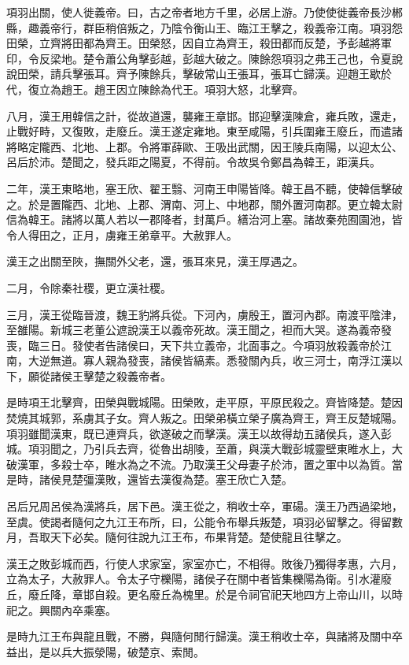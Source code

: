 項羽出關，使人徙義帝。曰，古之帝者地方千里，必居上游。乃使使徙義帝長沙郴縣，趣義帝行，群臣稍倍叛之，乃陰令衡山王、臨江王擊之，殺義帝江南。項羽怨田榮，立齊將田都為齊王。田榮怒，因自立為齊王，殺田都而反楚，予彭越將軍印，令反梁地。楚令蕭公角擊彭越，彭越大破之。陳餘怨項羽之弗王己也，令夏說說田榮，請兵擊張耳。齊予陳餘兵，擊破常山王張耳，張耳亡歸漢。迎趙王歇於代，復立為趙王。趙王因立陳餘為代王。項羽大怒，北擊齊。

八月，漢王用韓信之計，從故道還，襲雍王章邯。邯迎擊漢陳倉，雍兵敗，還走，止戰好畤，又復敗，走廢丘。漢王遂定雍地。東至咸陽，引兵圍雍王廢丘，而遣諸將略定隴西、北地、上郡。令將軍薛歐、王吸出武關，因王陵兵南陽，以迎太公、呂后於沛。楚聞之，發兵距之陽夏，不得前。令故吳令鄭昌為韓王，距漢兵。

二年，漢王東略地，塞王欣、翟王翳、河南王申陽皆降。韓王昌不聽，使韓信擊破之。於是置隴西、北地、上郡、渭南、河上、中地郡，關外置河南郡。更立韓太尉信為韓王。諸將以萬人若以一郡降者，封萬戶。繕治河上塞。諸故秦苑囿園池，皆令人得田之，正月，虜雍王弟章平。大赦罪人。

漢王之出關至陜，撫關外父老，還，張耳來見，漢王厚遇之。

二月，令除秦社稷，更立漢社稷。

三月，漢王從臨晉渡，魏王豹將兵從。下河內，虜殷王，置河內郡。南渡平陰津，至雒陽。新城三老董公遮說漢王以義帝死故。漢王聞之，袒而大哭。遂為義帝發喪，臨三日。發使者告諸侯曰，天下共立義帝，北面事之。今項羽放殺義帝於江南，大逆無道。寡人親為發喪，諸侯皆縞素。悉發關內兵，收三河士，南浮江漢以下，願從諸侯王擊楚之殺義帝者。

是時項王北擊齊，田榮與戰城陽。田榮敗，走平原，平原民殺之。齊皆降楚。楚因焚燒其城郭，系虜其子女。齊人叛之。田榮弟橫立榮子廣為齊王，齊王反楚城陽。項羽雖聞漢東，既已連齊兵，欲遂破之而擊漢。漢王以故得劫五諸侯兵，遂入彭城。項羽聞之，乃引兵去齊，從魯出胡陵，至蕭，與漢大戰彭城靈壁東睢水上，大破漢軍，多殺士卒，睢水為之不流。乃取漢王父母妻子於沛，置之軍中以為質。當是時，諸侯見楚彊漢敗，還皆去漢復為楚。塞王欣亡入楚。

呂后兄周呂侯為漢將兵，居下邑。漢王從之，稍收士卒，軍碭。漢王乃西過梁地，至虞。使謁者隨何之九江王布所，曰，公能令布舉兵叛楚，項羽必留擊之。得留數月，吾取天下必矣。隨何往說九江王布，布果背楚。楚使龍且往擊之。

漢王之敗彭城而西，行使人求家室，家室亦亡，不相得。敗後乃獨得孝惠，六月，立為太子，大赦罪人。令太子守櫟陽，諸侯子在關中者皆集櫟陽為衛。引水灌廢丘，廢丘降，章邯自殺。更名廢丘為槐里。於是令祠官祀天地四方上帝山川，以時祀之。興關內卒乘塞。

是時九江王布與龍且戰，不勝，與隨何閒行歸漢。漢王稍收士卒，與諸將及關中卒益出，是以兵大振滎陽，破楚京、索閒。

